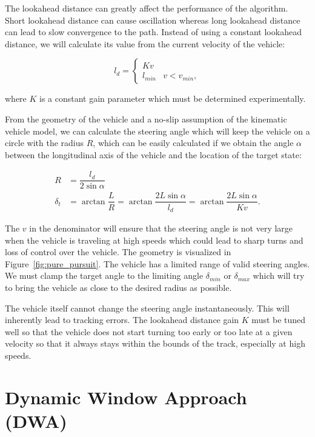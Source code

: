 The lookahead distance can greatly affect the performance of the algorithm. Short lookahead distance can cause oscillation whereas long lookahead distance can lead to slow convergence to the path. Instead of using a constant lookahead distance, we will calculate its value from the current velocity of the vehicle:

\[
	l_d=\begin{cases}
		Kv & \\
		l_{min} & v<v_{min},
		\end{cases}
\]

where $K$ is a constant gain parameter which must be determined experimentally.

From the geometry of the vehicle and a no-slip assumption of the kinematic vehicle model, we can calculate the steering angle which will keep the vehicle on a circle with the radius $R$, which can be easily calculated if we obtain the angle $\alpha$ between the longitudinal axis of the vehicle and the location of the target state:

\begin{equation*}
\begin{aligned}
R&=\dfrac{l_d }{2\sin\alpha} \\
\delta_t&=\arctan\dfrac{L}{R}=\arctan\dfrac{2L\sin\alpha}{l_d}=\arctan\dfrac{2L\sin\alpha}{Kv}.
\end{aligned}
\end{equation*}

The $v$ in the denominator will ensure that the steering angle is not very large when the vehicle is traveling at high speeds which could lead to sharp turns and loss of control over the vehicle. The geometry is visualized in Figure~\ref{fig:pure_pursuit}. The vehicle has a limited range of valid steering angles. We must clamp the target angle to the limiting angle $\delta_{min}$ or $\delta_{max}$ which will try to bring the vehicle as close to the desired radius as possible.

The vehicle itself cannot change the steering angle instantaneously. This will inherently lead to tracking errors. The lookahead distance gain $K$ must be tuned well so that the vehicle does not start turning too early or too late at a given velocity so that it always stays within the bounds of the track, especially at high speeds.

\section{Dynamic Window Approach (DWA)}

